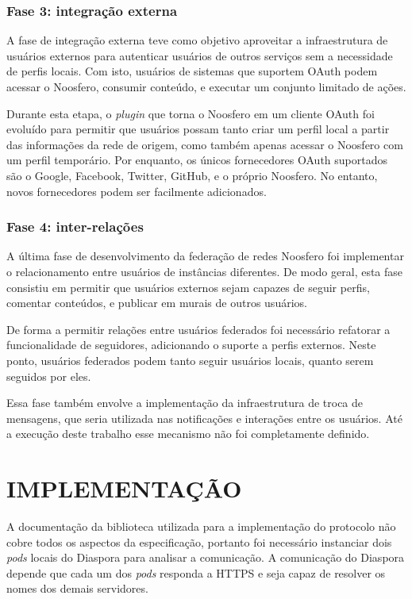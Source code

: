 \begin{apendicesenv}
\subsection{Fase 3: integração externa}

A fase de integração externa teve como objetivo aproveitar a infraestrutura de
usuários externos para autenticar usuários de outros serviços sem a necessidade de
perfis locais. Com isto, usuários de sistemas que suportem OAuth podem acessar o
Noosfero, consumir conteúdo, e executar um conjunto limitado de ações.

Durante esta etapa, o \textit{plugin} que torna o Noosfero em um cliente OAuth foi
evoluído para permitir que usuários possam tanto criar um perfil local a partir das
informações da rede de origem, como também apenas acessar o Noosfero com um perfil
temporário. Por enquanto, os únicos fornecedores OAuth suportados são o Google,
Facebook, Twitter, GitHub, e o próprio Noosfero. No entanto, novos fornecedores
podem ser facilmente adicionados.

\subsection{Fase 4: inter-relações}

A última fase de desenvolvimento da federação de redes Noosfero foi implementar o
relacionamento entre usuários de instâncias diferentes. De modo geral, esta fase
consistiu em permitir que usuários externos sejam capazes de seguir perfis, comentar
conteúdos, e publicar em murais de outros usuários.

De forma a permitir relações entre usuários federados foi necessário refatorar a
funcionalidade de seguidores, adicionando o suporte a perfis externos. Neste ponto,
usuários federados podem tanto seguir usuários locais, quanto serem seguidos por
eles.

Essa fase também envolve a implementação da infraestrutura de troca de mensagens,
que seria utilizada nas notificações e interações entre os usuários. Até a
execução deste trabalho esse mecanismo não foi completamente definido.

\chapter{IMPLEMENTAÇÃO}

A documentação da biblioteca utilizada para a implementação do protocolo não cobre
todos os aspectos da especificação, portanto foi necessário instanciar dois
\textit{pods} locais do Diaspora para analisar a comunicação. A comunicação do
Diaspora depende que cada um dos \textit{pods} responda a HTTPS e seja capaz de
resolver os nomes dos demais servidores.


\end{apendicesenv}

